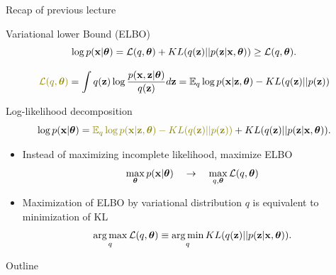 \begin{frame}{Recap of previous lecture}
	\begin{block}{Variational lower Bound (ELBO)}
		\vspace{-0.3cm}
		\[
			\log p(\mathbf{x}| \boldsymbol{\theta}) = \mathcal{L} (q, \boldsymbol{\theta}) + KL(q(\mathbf{z}) || p(\mathbf{z}|\mathbf{x}, \boldsymbol{\theta})) \geq \mathcal{L} (q, \boldsymbol{\theta}).
		\]
	\end{block}
	
	\vspace{-0.5cm}
	\[
	 	{\color{olive}\mathcal{L} (q, \btheta)} = \int q(\bz) \log \frac{p(\bx, \bz | \btheta)}{q(\bz)}d\bz = \mathbb{E}_{q} \log p(\bx | \bz, \btheta) - KL (q(\bz) || p(\bz))
	\]
	\vspace{-0.3cm}
	\begin{block}{Log-likelihood decomposition}
		\vspace{-0.5cm}
		\[
	 \log p(\bx| \btheta) = {\color{olive}\mathbb{E}_{q} \log p(\bx | \bz, \btheta) - KL (q(\bz) || p(\bz))} + KL(q(\bz) || p(\bz|\bx, \btheta)).
		\]
	\end{block}
	\begin{itemize}
	\item Instead of maximizing incomplete likelihood, maximize ELBO
   	\[
\max_{\boldsymbol{\theta}} p(\mathbf{x} | \boldsymbol{\theta}) \quad \rightarrow \quad \max_{q, \boldsymbol{\theta}} \mathcal{L} (q, \boldsymbol{\theta})
   	\]
   	\item Maximization of ELBO by variational distribution $q$ is equivalent to minimization of KL
  	\[
\operatorname*{arg\,max}_q \mathcal{L} (q, \boldsymbol{\theta}) \equiv \operatorname*{arg\,min}_q KL(q(\mathbf{z}) || p(\mathbf{z}|\mathbf{x}, \boldsymbol{\theta})).
  	\]
  	\end{itemize}
  	    
\end{frame}
\begin{frame}{Outline}
	\tableofcontents
\end{frame}
